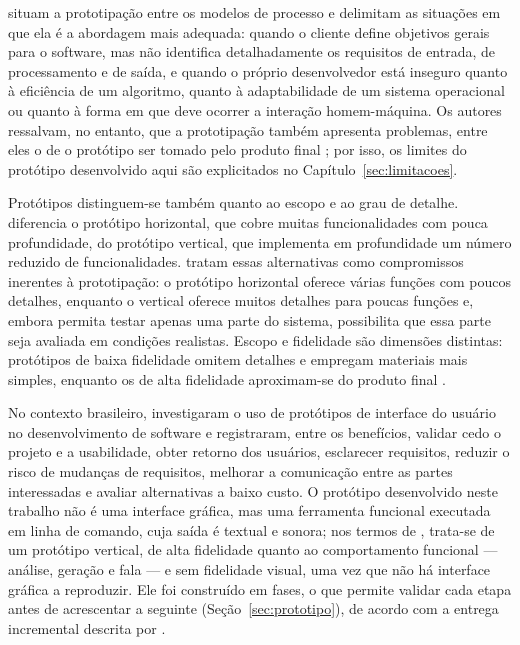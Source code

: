 \documentclass[
    12pt,                   %
    openright,              %
    oneside,                %
    a4paper,                %
    sumario=tradicional,    %
    english,                %
    brazil,                 %
    ]{abntex2}
\begin{document}
\textcite{pressman2021} situam a prototipação entre os modelos de processo e delimitam as situações em que ela é a abordagem mais adequada: quando o cliente define objetivos gerais para o software, mas não identifica detalhadamente os requisitos de entrada, de processamento e de saída, e quando o próprio desenvolvedor está inseguro quanto à eficiência de um algoritmo, quanto à adaptabilidade de um sistema operacional ou quanto à forma em que deve ocorrer a interação homem-máquina. Os autores ressalvam, no entanto, que a prototipação também apresenta problemas, entre eles o de o protótipo ser tomado pelo produto final \cite{pressman2021}; por isso, os limites do protótipo desenvolvido aqui são explicitados no Capítulo~\ref{sec:limitacoes}.

Protótipos distinguem-se também quanto ao escopo e ao grau de detalhe. \textcite{nielsen1993} diferencia o protótipo horizontal, que cobre muitas funcionalidades com pouca profundidade, do protótipo vertical, que implementa em profundidade um número reduzido de funcionalidades. \textcite{rogers2013} tratam essas alternativas como compromissos inerentes à prototipação: o protótipo horizontal oferece várias funções com poucos detalhes, enquanto o vertical oferece muitos detalhes para poucas funções e, embora permita testar apenas uma parte do sistema, possibilita que essa parte seja avaliada em condições realistas. Escopo e fidelidade são dimensões distintas: protótipos de baixa fidelidade omitem detalhes e empregam materiais mais simples, enquanto os de alta fidelidade aproximam-se do produto final \cite{rogers2013}.

No contexto brasileiro, \textcite{latinoware7985} investigaram o uso de protótipos de interface do usuário no desenvolvimento de software e registraram, entre os benefícios, validar cedo o projeto e a usabilidade, obter retorno dos usuários, esclarecer requisitos, reduzir o risco de mudanças de requisitos, melhorar a comunicação entre as partes interessadas e avaliar alternativas a baixo custo. O protótipo desenvolvido neste trabalho não é uma interface gráfica, mas uma ferramenta funcional executada em linha de comando, cuja saída é textual e sonora; nos termos de \textcite{nielsen1993}, trata-se de um protótipo vertical, de alta fidelidade quanto ao comportamento funcional --- análise, geração e fala --- e sem fidelidade visual, uma vez que não há interface gráfica a reproduzir. Ele foi construído em fases, o que permite validar cada etapa antes de acrescentar a seguinte (Seção~\ref{sec:prototipo}), de acordo com a entrega incremental descrita por \textcite{sommerville2018}.
\end{document}
